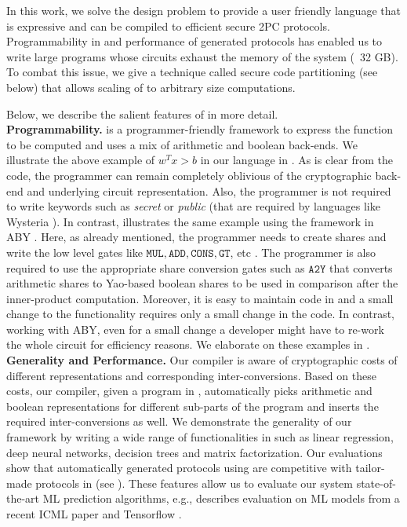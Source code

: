 In this work, we solve the design problem to provide a user friendly language that is expressive and can be compiled to efficient secure 2PC protocols.
Programmability in \tool and performance of generated protocols has enabled us to write large programs whose circuits  exhaust the memory of the system (~32 GB). To combat this issue, we give a technique called secure code partitioning (see below) that allows scaling of \tool to arbitrary size computations.

Below, we describe the salient features of \tool in more detail. \\


\noindent\textbf{Programmability.} \tool is a programmer-friendly framework to
express the function to be computed and uses a mix of arithmetic and
boolean \mpc back-ends. We illustrate the above example of $w^Tx
>b$ in our language in . 
As is clear from the code, the programmer can remain completely oblivious of the cryptographic back-end and underlying circuit representation. 
Also,  the programmer is not required to write keywords such as {\em secret}
or {\em public} (that are required by languages like Wysteria \cite{wysteria}). 
 In contrast,  illustrates
the same example using the framework in ABY \cite{aby}. Here, as
already mentioned, the programmer needs to create shares and write the low level gates
like $\mathtt{MUL, ADD, CONS, GT}$, etc . The programmer is also required
to use the appropriate share conversion gates such as $\mathtt{A2Y}$ that
converts arithmetic shares to Yao-based boolean shares to be used in comparison after the inner-product computation.
Moreover, it is easy to
maintain code in \tool and a small change to the functionality requires
only a small change in the code. In contrast, working with ABY, even
for a small change a developer might have to re-work the whole circuit
for efficiency reasons. We elaborate on these examples  in
. \\

\noindent\textbf{Generality and Performance.} Our compiler is aware of cryptographic costs of different representations and corresponding inter-conversions.  Based on these costs, our compiler, given a program in \tool, automatically picks arithmetic and boolean representations for different sub-parts of the program and inserts the required inter-conversions as well. 
We demonstrate the generality of our framework by writing a wide range of functionalities in \tool such as linear regression, deep neural networks, decision trees and matrix factorization.
Our evaluations show that automatically generated protocols using \tool are competitive with tailor-made protocols in \cite{shafindss,wu,barni,minionn,secureml,valeriaMatrix} (see ). These features allow us to evaluate our system state-of-the-art ML prediction algorithms, e.g.,  describes evaluation on ML models from a recent ICML paper \cite{bonsai} and Tensorflow \cite{tensorflow}. \\

